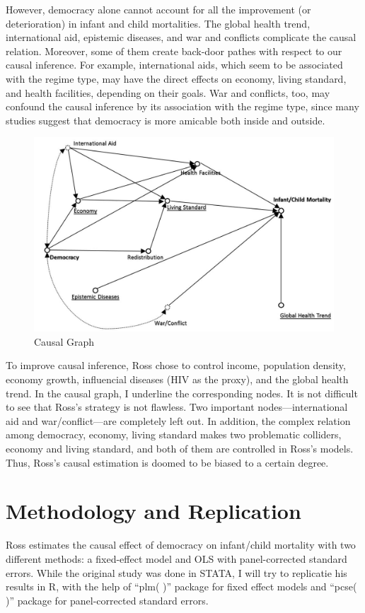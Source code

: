 \documentclass[12pt, lelterpaper, reqno]{article}\usepackage[]{graphicx}\usepackage[]{color}
\begin{document}
However, democracy alone cannot account for all the improvement (or deterioration) in infant and child mortalities. The global health trend, international aid, epistemic diseases, and war and conflicts complicate the causal relation. Moreover, some of them create back-door pathes with respect to our causal inference. For example, international aids, which seem to be associated with the regime type, may have the direct effects on economy, living standard, and health facilities, depending on their goals. War and conflicts, too, may confound the causal inference by its association with the regime type, since many studies suggest that democracy is more amicable both inside and outside.

\begin{figure}[H]
	\centering
	\includegraphics[width=140mm]{cg.jpg}
	\caption{Causal Graph}
\end{figure}

To improve causal inference, Ross chose to control income, population density, economy growth, influencial diseases (HIV as the proxy), and the global health trend. In the causal graph, I underline the corresponding nodes. It is not difficult to see that Ross's strategy is not flawless. Two important nodes---international aid and war/conflict---are completely left out. In addition, the complex relation among democracy, economy, living standard makes two problematic colliders, economy and living standard, and both of them are controlled in Ross's models. Thus, Ross's causal estimation is doomed to be biased to a certain degree.

\section{Methodology and Replication}
Ross estimates the causal effect of democracy on infant/child mortality with two different methods: a fixed-effect model and OLS with panel-corrected standard errors. While the original study was done in STATA, I will try to replicatie his results in R, with the help of ``plm( )'' package for fixed effect models and ``pcse( )'' package for panel-corrected standard errors.
\end{document}
